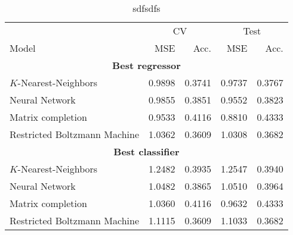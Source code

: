\begin{table}
\centering
\begin{tabular}{lrrrr}
\toprule
	      &  \multicolumn{2}{c}{CV} & \multicolumn{2}{c}{Test} \\
           \cmidrule(lr){2-3}\cmidrule(lr){4-5}
Model	 &  MSE & Acc. & MSE & Acc.  \\
\midrule
\multicolumn{5}{c}{\textbf{Best regressor}}\\
$K$-Nearest-Neighbors 					&   0.9898 &      0.3741 &   0.9737 &        0.3767 \\
Neural Network 							&   0.9855 &      0.3851 &   0.9552 &        0.3823 \\
Matrix completion 						&   0.9533 &      0.4116 &   0.8810 &        0.4333 \\
Restricted Boltzmann Machine 			&   1.0362 &      0.3609 &   1.0308 &        0.3682 \\
\midrule
\multicolumn{5}{c}{\textbf{Best classifier}}\\
$K$-Nearest-Neighbors 					&   1.2482 &      0.3935 &   1.2547 &        0.3940 \\
Neural Network 							&   1.0482 &      0.3865 &   1.0510 &        0.3964 \\
Matrix completion 						&   1.0360 &      0.4116 &   0.9632 &        0.4333 \\
Restricted Boltzmann Machine 			&   1.1115 &      0.3609 &   1.1033 &        0.3682 \\
\bottomrule
\end{tabular}
\caption{sdfsdfs}
\label{tab:results.model}
\end{table}
